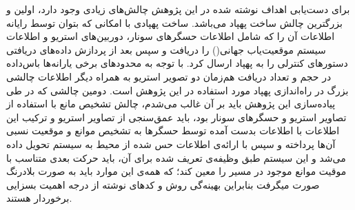 برای دست‌یابی اهداف نوشته شده در این پژوهش چالش‌های زیادی وجود دارد، اولین و بزرگترین چالش ساخت پهپاد می‌باشد. ساخت پهپادی با امکانی که بتوان توسط رایانه اطلاعات آن را که شامل اطلاعات حسگرهای سونار، دوربین‌های استریو و اطلاعات سیستم موقعیت‌یاب جهانی() را دریافت و سپس بعد از پردازش داده‌های دریافتی دستورهای کنترلی را به پهپاد ارسال کرد. با توجه به محدودهای برخی یارانه‌ها باس‌داده در حجم و تعداد دریافت هم‌زمان دو تصویر استریو به همراه دیگر اطلاعات چالشی بزرگ در راه‌اندازی پهپاد مورد استفاده در این پژوهش است.
 دومین چالشی که در طی پیاده‌سازی این پژوهش باید بر آن غالب می‌شدم، چالش تشخیص مانع با استفاده از تصاویر استریو و حسگرهای سونار بود، باید عمق‌سنجی از تصاویر استریو و ترکیب این اطلاعات با اطلاعات بدست آمده توسط حسگرها به تشخیص موانع و موقعیت نسبی آن‌ها پرداخته و سپس با ارائه‌ی اطلاعات حس شده از محیط به سیستم  تحویل داده می‌شد و این سیستم طبق وظیفه‌ی تعریف شده برای آن، باید حرکت بعدی متناسب با موقیت موانع موجود در مسیر را معین کند؛ که همه‌ی این موارد باید به صورت بلادرنگ صورت میگرفت بنابراین بهینه‌گی روش و کدهای نوشته از درجه اهمیت بسزایی برخوردار هستند.